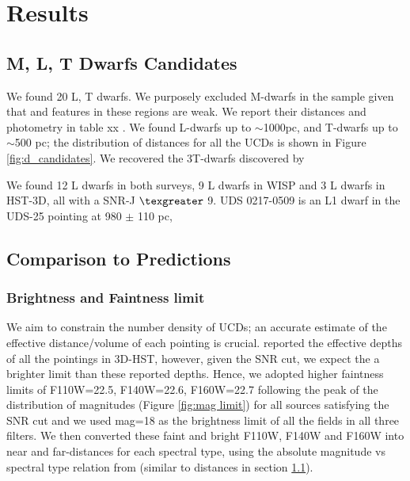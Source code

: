 \documentclass[manuscript]{aastex}
\begin{document}
\section {Results}
\subsection{M, L, T Dwarfs Candidates}  \label{candidates}

We found 20 L, T dwarfs. We purposely excluded M-dwarfs in the sample given that \wat and \meth features in these regions are weak. We report their distances and photometry in table  xx  .  We found L-dwarfs up to $\sim$1000pc, and T-dwarfs up to $\sim$500 pc; the distribution of distances for all the UCDs is shown in Figure \ref{fig:d_candidates}. We recovered the 3T-dwarfs discovered by \citealt{2012ApJ...752L..14M}

We found 12 L dwarfs in both surveys, 9 L dwarfs in WISP and 3  L dwarfs in HST-3D, all with a SNR-J $\texgreater$ 9. UDS 0217-0509 is an L1 dwarf in the UDS-25 pointing at 980 $\pm$ 110 pc, 
\subsection{Comparison to Predictions }

\subsubsection{Brightness and Faintness limit }

We aim to constrain the number density of UCDs; an accurate estimate of the effective distance/volume of each pointing is crucial.  \citealt{Momcheva2016} reported the effective depths of all the pointings in 3D-HST, however, given the SNR cut, we expect the a brighter limit than these reported depths. Hence, we adopted higher faintness limits of F110W=22.5, F140W=22.6, F160W=22.7 following the peak of the distribution of magnitudes (Figure \ref{fig:mag limit}) for all sources satisfying the SNR cut and we used mag=18 as the brightness limit of all the fields in all three filters. We then converted these faint and bright F110W, F140W and F160W into near and far-distances for each spectral type, using the absolute magnitude vs spectral type relation from \citealt{2012ApJS..201...19D} (similar to distances in section \ref{candidates}). 
\end{document}
